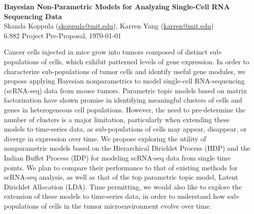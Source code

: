 \documentclass[11pt]{article}
\begin{document}
\begin{centering}
\Large
    \textbf{Bayesian Non-Parametric Models for Analyzing Single-Cell RNA Sequencing Data}  \\
    \vspace{2mm}
    \normalsize
    Skanda Koppula (\url{skoppula@mit.edu}), Karren Yang (\url{karren@mit.edu}) \\
    \vspace{2mm}
    \normalsize
    6.882 Project Pre-Proposal, \today \\
\end{centering}
\vspace{5mm}

Cancer cells injected in mice grow into tumors composed of distinct sub-populations of cells, which exhibit patterned levels of gene expression. In order to characterize sub-populations of tumor cells and identify useful gene modules, we propose applying Bayesian nonparametrics to model single-cell RNA-sequencing (scRNA-seq) data from mouse tumors. Parametric topic models based on matrix factorization have shown promise in identifying meaningful clusters of cells and genes in heterogeneous cell populations. However, the need to pre-determine the number of clusters is a major limitation, particularly when extending these models to time-series data, as sub-populations of cells may appear, disappear, or diverge in expression over time. We propose exploring the utility of nonparametric models based on the Hierarchical Dirichlet Process (HDP) and the Indian Buffet Process (IDP) for modeling scRNA-seq data from single time points. We plan to compare their performance to that of existing methods for scRNA-seq analysis, as well as that of the top parametric topic model, Latent Dirichlet Allocation (LDA). Time permitting, we would also like to explore the extension of these models to time-series data, in order to understand how sub-populations of cells in the tumor microenvironment evolve over time.
\end{document}
